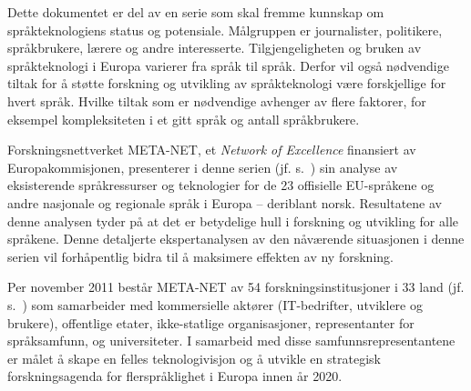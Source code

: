 Dette dokumentet er del av en serie som skal fremme kunnskap om språkteknologiens status og potensiale. Målgruppen er journalister, politikere, språkbrukere, lærere og andre interesserte. Tilgjengeligheten og bruken av språkteknologi i Europa varierer fra språk til språk. Derfor vil også nødvendige tiltak for å støtte forskning og utvikling av språkteknologi være forskjellige for hvert språk. Hvilke tiltak som er nødvendige avhenger av flere faktorer, for eksempel kompleksiteten i et gitt språk og antall språkbrukere.

Forskningsnettverket META-NET, et \emph{Network of Excellence} finansiert av Europakommisjonen, presenterer i denne serien  (jf. s.~\pageref{whitepaperseries}) sin analyse av eksisterende språkressurser og teknologier for de 23 offisielle EU-språkene og andre nasjonale og regionale språk i Europa -- deriblant norsk. Resultatene av denne analysen tyder på at det er betydelige hull i forskning og utvikling for alle språkene. Denne detaljerte ekspertanalysen av den nåværende situasjonen i denne serien vil forhåpentlig bidra til å maksimere effekten av ny forskning.

Per november 2011 består META-NET av 54 forskningsinstitusjoner i 33 land (jf. s.~\pageref{metanetmembers}) som samarbeider med kommersielle aktører (IT-bedrifter, utviklere og brukere), offentlige etater, ikke-statlige organisasjoner, representanter for språksamfunn, og universiteter. I samarbeid med disse samfunnsrepresentantene er målet å skape en felles teknologivisjon og å utvikle en strategisk forskningsagenda for flerspråklighet i Europa innen år 2020.